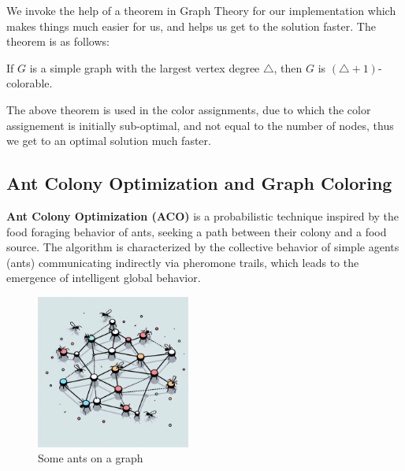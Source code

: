 \documentclass{article}
\theoremstyle{mytheoremstyle}
\theoremstyle{mytheoremstyle}
\theoremstyle{myproblemstyle}
\begin{document}
We invoke the help of a theorem in Graph Theory for our implementation which makes things much easier for us, and helps us get to the solution faster. The theorem is as follows:
\begin{theorem}
    If $G$ is a simple graph with the largest vertex degree $ \triangle $, then $G$ is $ (\triangle + 1) $-colorable.
\end{theorem}
The above theorem is used in the color assignments, due to which the color assignement is initially sub-optimal, and not equal to the number of nodes, thus we get to an optimal solution much faster.

\subsection{Ant Colony Optimization and Graph Coloring}
\textbf{Ant Colony Optimization (ACO)} is a probabilistic technique inspired by the food foraging behavior of ants, seeking a path between their colony and a food source. The algorithm is characterized by the collective behavior of simple agents (ants) communicating indirectly via pheromone trails, which leads to the emergence of intelligent global behavior.

\begin{figure}[htbp]
    \centering
    \includegraphics[width=0.45\textwidth]{antcol.jpeg}
    \caption{Some ants on a graph}
\end{figure}
\end{document}
